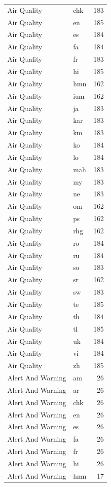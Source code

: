 \begin{longtable}{p{3cm} p{3cm} r}
Air Quality & chk & 183 \\
Air Quality & en & 185 \\
Air Quality & es & 184 \\
Air Quality & fa & 184 \\
Air Quality & fr & 183 \\
Air Quality & hi & 185 \\
Air Quality & hmn & 162 \\
Air Quality & ium & 162 \\
Air Quality & ja & 183 \\
Air Quality & kar & 183 \\
Air Quality & km & 183 \\
Air Quality & ko & 184 \\
Air Quality & lo & 184 \\
Air Quality & mah & 183 \\
Air Quality & my & 183 \\
Air Quality & ne & 183 \\
Air Quality & om & 162 \\
Air Quality & ps & 162 \\
Air Quality & rhg & 162 \\
Air Quality & ro & 184 \\
Air Quality & ru & 184 \\
Air Quality & so & 183 \\
Air Quality & sr & 162 \\
Air Quality & sw & 183 \\
Air Quality & te & 185 \\
Air Quality & th & 184 \\
Air Quality & tl & 185 \\
Air Quality & uk & 184 \\
Air Quality & vi & 184 \\
Air Quality & zh & 185 \\
Alert And Warning & am & 26 \\
Alert And Warning & ar & 26 \\
Alert And Warning & chk & 26 \\
Alert And Warning & en & 26 \\
Alert And Warning & es & 26 \\
Alert And Warning & fa & 26 \\
Alert And Warning & fr & 26 \\
Alert And Warning & hi & 26 \\
Alert And Warning & hmn & 17 \\

\end{longtable}
